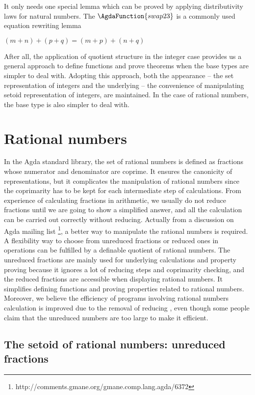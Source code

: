 It only needs one special lemma which can be proved by applying distributivity
laws for natural numbers. The $\AgdaFunction{swap23}$ is a commonly
used equation rewriting lemma

$(m + n) + (p + q) = (m + p) + (n + q)$

After all, the application of quotient structure in the integer case
provides us a general approach to define functions and prove theorems
when the base types are simpler to deal with.
Adopting this approach, both the appearance -- the set representation of integers
and the underlying -- the convenience of manipulating setoid
representation of integers, are maintained.
In the case of rational numbers, the base type is also simpler to deal with.


\section{Rational numbers}

In the Agda standard library, the set of rational numbers is defined
as fractions whose numerator and denominator are coprime. It ensures
the canonicity of representations, but it complicates the manipulation
of rational numbers since the coprimarity has to be kept for each
intermediate step of calculations. From experience of calculating
fractions in arithmetic, we usually do not reduce fractions until we are going to
show a simplified answer, and all the calculation can be carried out correctly
without reducing. Actually from  a discussion on Agda mailing list
\footnote{http://comments.gmane.org/gmane.comp.lang.agda/6372}, a better way to manipulate the
rational numbers is required. A flexibility way to choose from unreduced fractions or reduced ones in
operations can be fulfilled by a definable quotient of
rational numbers. The unreduced fractions are mainly used for underlying calculations and
property proving because it ignores a lot of reducing steps and
coprimarity checking, and the reduced fractions are accessible when
displaying rational numbers. 
It simplifies defining functions and proving properties related to rational
numbers. Moreover, we believe the efficiency of programs involving rational
numbers calculation is improved due to the removal of reducing , even
though some people claim that the unreduced numbers are too
large to make it efficient.


\subsection{The setoid of rational numbers: unreduced fractions}

